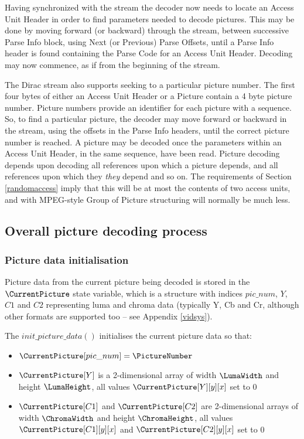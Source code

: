 \begin{informative*}
Having synchronized with the stream the decoder now needs to locate an Access Unit Header in 
order to find parameters needed to decode pictures. This may be done by moving forward (or backward) 
through the stream, between successive Parse Info block, using Next (or Previous) Parse Offsets, 
until a Parse Info header is found containing the Parse Code for an Access Unit Header. Decoding 
may now commence, as if from the beginning of the stream.

The Dirac stream also supports seeking to a particular picture number. The first four bytes of either 
an Access Unit Header or a Picture contain a 4 byte picture number. Picture numbers provide an
 identifier for each picture with a sequence. So, to find a particular picture, the decoder may 
move forward or backward in the stream, using the offsets in the Parse Info headers, until the 
correct picture number is reached. A picture may be decoded once the parameters within an 
Access Unit Header, in the same sequence, have been read. Picture decoding depends upon decoding
all references upon which a picture depends, and all references upon which they {\em they} depend
and so on. The requirements of Section \ref{randomaccess} imply that this will be at most the
contents of two access units, and with MPEG-style Group of Picture structuring will normally
be much less.
\end{informative*}

\subsection{Overall picture decoding process}
\label{overallpicturedec}

\subsubsection{Picture data initialisation}
\label{picdataconventions}

Picture data from the current picture being decoded is stored in the $\CurrentPicture$ state
variable, which is a structure with indices $pic\_num$, $Y$, $C1$ and $C2$ representing
luma and chroma data (typically Y, Cb and Cr, although other formats are supported too -- see
Appendix \ref{vidsys}).


The $init\_picture\_data()$ initialises the current picture data so that:
\begin{itemize}
\item $\CurrentPicture[pic\_num]=\PictureNumber$
\item $\CurrentPicture[Y]$ is a 2-dimensional array of width $\LumaWidth$ and height $\LumaHeight$, 
all values $\CurrentPicture[Y][y][x]$ set to 0
\item $\CurrentPicture[C1]$ and $\CurrentPicture[C2]$ are 2-dimensional arrays of width $\ChromaWidth$ and height $\ChromaHeight$, 
all values $\CurrentPicture[C1][y][x]$ and $\CurrentPicture[C2][y][x]$ set to 0
\end{itemize}

